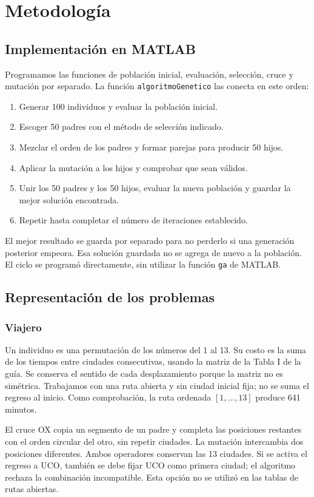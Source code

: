 \documentclass[conference]{IEEEtran}
\begin{document}
\section{Metodología}
\subsection{Implementación en MATLAB}
Programamos las funciones de población inicial, evaluación, selección, cruce y mutación por separado. La función \texttt{algoritmoGenetico} las conecta en este orden:
\begin{enumerate}
\item Generar 100 individuos y evaluar la población inicial.
\item Escoger 50 padres con el método de selección indicado.
\item Mezclar el orden de los padres y formar parejas para producir 50 hijos.
\item Aplicar la mutación a los hijos y comprobar que sean válidos.
\item Unir los 50 padres y los 50 hijos, evaluar la nueva población y guardar la mejor solución encontrada.
\item Repetir hasta completar el número de iteraciones establecido.
\end{enumerate}
El mejor resultado se guarda por separado para no perderlo si una generación posterior empeora. Esa solución guardada no se agrega de nuevo a la población. El ciclo se programó directamente, sin utilizar la función \texttt{ga} de MATLAB.

\subsection{Representación de los problemas}
\subsubsection{Viajero}
Un individuo es una permutación de los números del 1 al 13. Su costo es la suma de los tiempos entre ciudades consecutivas, usando la matriz de la Tabla I de la guía. Se conserva el sentido de cada desplazamiento porque la matriz no es simétrica. Trabajamos con una ruta abierta y sin ciudad inicial fija; no se suma el regreso al inicio. Como comprobación, la ruta ordenada $[1,\ldots,13]$ produce 641 minutos.

El cruce OX copia un segmento de un padre y completa las posiciones restantes con el orden circular del otro, sin repetir ciudades. La mutación intercambia dos posiciones diferentes. Ambos operadores conservan las 13 ciudades. Si se activa el regreso a UCO, también se debe fijar UCO como primera ciudad; el algoritmo rechaza la combinación incompatible. Esta opción no se utilizó en las tablas de rutas abiertas.
\end{document}
